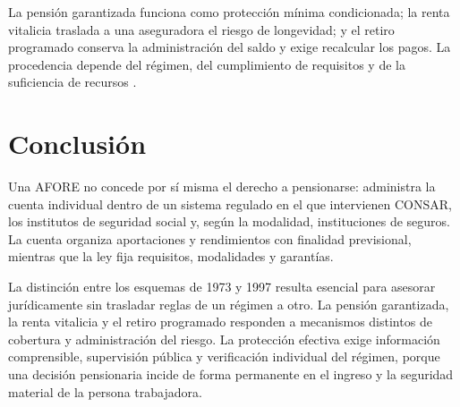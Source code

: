 \documentclass[11pt,letterpaper,oneside]{article}
\begin{document}
La pensión garantizada funciona como protección mínima condicionada; la renta vitalicia traslada a una aseguradora el riesgo de longevidad; y el retiro programado conserva la administración del saldo y exige recalcular los pagos. La procedencia depende del régimen, del cumplimiento de requisitos y de la suficiencia de recursos \citep{lss2026,consarSitio2026,bricenoRuiz2011}.

\section{Conclusión}
Una AFORE no concede por sí misma el derecho a pensionarse: administra la cuenta individual dentro de un sistema regulado en el que intervienen CONSAR, los institutos de seguridad social y, según la modalidad, instituciones de seguros. La cuenta organiza aportaciones y rendimientos con finalidad previsional, mientras que la ley fija requisitos, modalidades y garantías.

La distinción entre los esquemas de 1973 y 1997 resulta esencial para asesorar jurídicamente sin trasladar reglas de un régimen a otro. La pensión garantizada, la renta vitalicia y el retiro programado responden a mecanismos distintos de cobertura y administración del riesgo. La protección efectiva exige información comprensible, supervisión pública y verificación individual del régimen, porque una decisión pensionaria incide de forma permanente en el ingreso y la seguridad material de la persona trabajadora.


\end{document}
